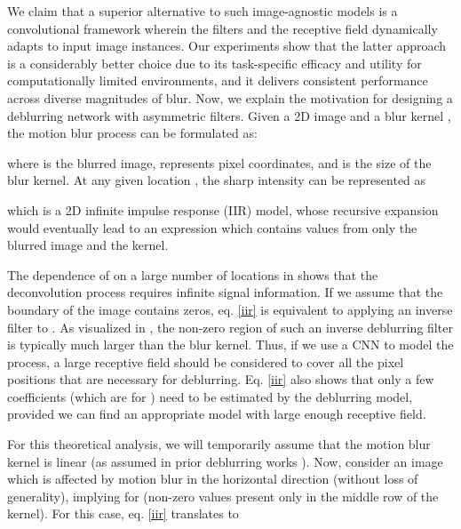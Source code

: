 \documentclass[letterpaper]{article} \usepackage{aaai20}  \usepackage{times}  \usepackage{helvet} \usepackage{courier}  \usepackage[hyphens]{url}  \usepackage{graphicx} \urlstyle{rm} \def\UrlFont{\rm}  \usepackage{graphicx}  \frenchspacing  \setlength{\pdfpagewidth}{8.5in}  \setlength{\pdfpageheight}{11in}
\begin{document}
We claim that a superior alternative to such image-agnostic models is a convolutional framework wherein the filters and the receptive field dynamically adapts to input image instances. Our experiments show that the latter approach is a considerably better choice due to its task-specific efficacy and utility for computationally limited environments, and it delivers consistent performance across diverse magnitudes of blur. Now, we explain the motivation for designing a deblurring network with asymmetric filters. Given a 2D image  and a blur kernel , the motion blur process can be formulated as:




 
where  is the blurred image,  represents pixel coordinates, and  is the size of the blur kernel. At any given location , the sharp intensity can be represented as  


\begin{small}
     
\end{small}

which is a 2D infinite impulse response (IIR) model, whose recursive expansion would eventually lead to an expression which contains values from only the blurred image and the kernel.

The dependence of  on a large number of locations in  shows that the deconvolution process requires infinite signal information. If we assume that the boundary of the image contains zeros, eq. \ref{iir} is equivalent to applying an inverse filter to . As visualized in \cite{zhang2018dynamic}, the non-zero region of such an inverse deblurring filter is typically much larger than the blur kernel. Thus, if we use a CNN to model the process, a large receptive field should be considered to cover all the pixel positions that are necessary for deblurring. Eq. \ref{iir} also shows that only a few coefficients (which are  for ) need to be estimated by the deblurring model, provided we can find an appropriate model with large enough receptive field. 


For this theoretical analysis, we will temporarily assume that the motion blur kernel  is linear (as assumed in prior deblurring works \cite{sun2015learning,gong2017motion}). Now, consider an  image  which is affected by motion blur in the horizontal direction (without loss of generality), implying  for  (non-zero values present only in the middle row of the kernel). For this case, eq. \ref{iir} translates to
 
\end{document}
